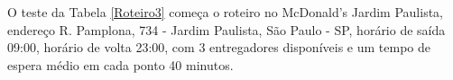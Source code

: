 \begin{center}
	\label{fig:Extra-Entregador1}
\end{center}

\pagebreak
O teste da Tabela \ref{Roteiro3} começa o roteiro no McDonald's Jardim Paulista, endereço R. Pamplona, 734 - Jardim Paulista, São Paulo - SP, horário de saída 09:00, horário de volta 23:00, com 3 entregadores disponíveis e um tempo de espera médio em cada ponto 40 minutos.


